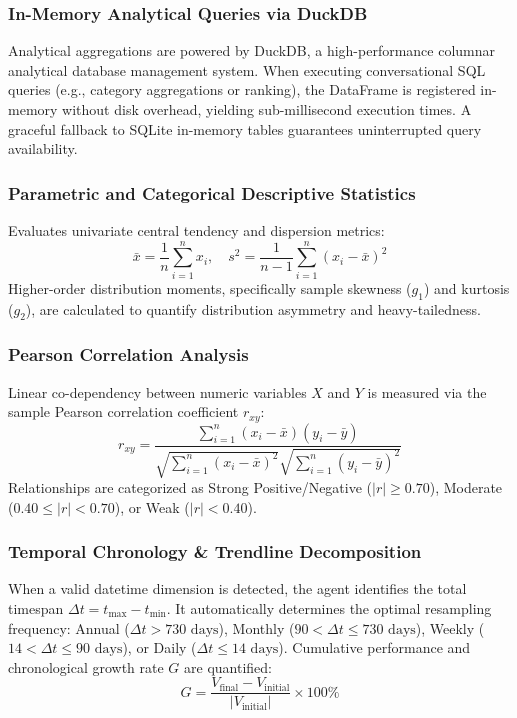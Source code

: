 \documentclass[10pt,journal,compsoc]{IEEEtran}
\begin{document}
\subsubsection{In-Memory Analytical Queries via DuckDB}
Analytical aggregations are powered by DuckDB, a high-performance columnar analytical database management system. When executing conversational SQL queries (e.g., category aggregations or ranking), the DataFrame is registered in-memory without disk overhead, yielding sub-millisecond execution times. A graceful fallback to SQLite in-memory tables guarantees uninterrupted query availability.

\subsubsection{Parametric and Categorical Descriptive Statistics}
Evaluates univariate central tendency and dispersion metrics:
\begin{equation}
\bar{x} = \frac{1}{n} \sum_{i=1}^n x_i, \quad s^2 = \frac{1}{n-1} \sum_{i=1}^n (x_i - \bar{x})^2
\end{equation}
Higher-order distribution moments, specifically sample skewness ($g_1$) and kurtosis ($g_2$), are calculated to quantify distribution asymmetry and heavy-tailedness.

\subsubsection{Pearson Correlation Analysis}
Linear co-dependency between numeric variables $X$ and $Y$ is measured via the sample Pearson correlation coefficient $r_{xy}$:
\begin{equation}
r_{xy} = \frac{\sum_{i=1}^n (x_i - \bar{x})(y_i - \bar{y})}{\sqrt{\sum_{i=1}^n (x_i - \bar{x})^2} \sqrt{\sum_{i=1}^n (y_i - \bar{y})^2}}
\end{equation}
Relationships are categorized as Strong Positive/Negative ($|r| \ge 0.70$), Moderate ($0.40 \le |r| < 0.70$), or Weak ($|r| < 0.40$).

\subsubsection{Temporal Chronology & Trendline Decomposition}
When a valid datetime dimension is detected, the agent identifies the total timespan $\Delta t = t_{\max} - t_{\min}$. It automatically determines the optimal resampling frequency: Annual ($\Delta t > 730\text{ days}$), Monthly ($90 < \Delta t \le 730\text{ days}$), Weekly ($14 < \Delta t \le 90\text{ days}$), or Daily ($\Delta t \le 14\text{ days}$). Cumulative performance and chronological growth rate $G$ are quantified:
\begin{equation}
G = \frac{V_{\text{final}} - V_{\text{initial}}}{|V_{\text{initial}}|} \times 100\%
\end{equation}
\end{document}
